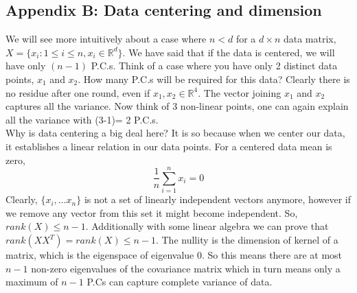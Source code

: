 \documentclass[12pt,a4paper]{article}
\begin{document}
\newpage
\subsection{Appendix B: Data centering and dimension}
We will see more intuitively about a case where $n<d$ for a $d \times n$ data matrix, $X = \{x_i:1\leq i\leq n,x_i\in\mathbb{R}^d\}$. We have said that if the data is centered, we will have only $(n-1)$ P.C.s. Think of a case where you have only 2 distinct data points, $x_1$ and $x_2$. How many P.C.s will be required for this data? Clearly there is no residue after one round, even if $x_1,x_2 \in \mathbb{R}^4$. The vector joining $x_1$ and $x_2$ captures all the variance.
Now think of 3 non-linear points, one can again explain all the variance with (3-1)= 2 P.C.s. \\
Why is data centering a big deal here? It is so because when we center our data, it establishes a linear relation in our data points. For a centered data mean is zero, $$ \dfrac{1}{n}\sum_{i=1}^{n} x_i = 0$$
Clearly, $\{x_i, \dots x_n\}$ is not a set of linearly independent vectors anymore, however if we remove any vector from this set it might become independent. So, $rank(X) \leq n-1$.
Additionally with some linear algebra we can prove that $rank(XX^T) = rank(X) \leq n-1$. The nullity is the dimension of kernel of a matrix, which is the eigenspace of eigenvalue 0. So this means there are at most $n-1$ non-zero eigenvalues of the covariance matrix which in turn means only a maximum of $n-1$ P.Cs can capture complete variance of data.
\end{document}
